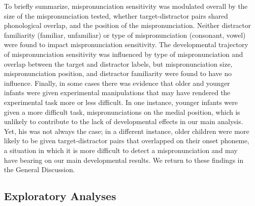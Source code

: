 \documentclass[man]{apa6}
\begin{document}
To briefly summarize, mispronunciation sensitivity was modulated overall by the size of the mispronunciation tested, whether target-distractor pairs shared phonological overlap, and the position of the mispronunciation. Neither distractor familiarity (familiar, unfamiliar) or type of mispronunciation (consonant, vowel) were found to impact mispronunciation sensitivity. The developmental trajectory of mispronunciation sensitivity was influenced by type of mispronunciation and overlap between the target and distractor labels, but mispronunciation size, mispronunciation position, and distractor familiarity were found to have no influence. Finally, in some cases there was evidence that older and younger infants were given experimental manipulations that may have rendered the experimental task more or less difficult. In one instance, younger infants were given a more difficult task, mispronunciations on the medial position, which is unlikely to contribute to the lack of developmental effects in our main analysis. Yet, his was not always the case; in a different instance, older children were more likely to be given target-distractor pairs that overlapped on their onset phoneme, a situation in which it is more difficult to detect a mispronunciation and may have bearing on our main developmental results. We return to these findings in the General Discussion.

\hypertarget{exploratory-analyses}{%
\subsection{Exploratory Analyses}\label{exploratory-analyses}}
\end{document}
